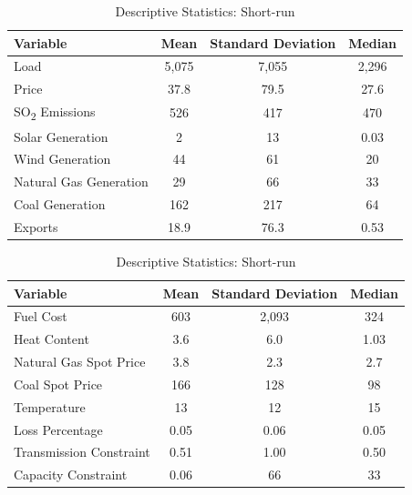 \documentclass[12pt]{article}
\begin{document}
\begin{table}[htbp]
\centering
\begin{tabular}{lccc}
\toprule
\textbf{Variable} & \textbf{Mean} & \textbf{Standard Deviation} & \textbf{Median} \\
\midrule
Load & 5{,}075 & 7{,}055 & 2{,}296 \\
Price & 37.8 & 79.5 & 27.6 \\
SO\textsubscript{2} Emissions & 526 & 417 & 470 \\
Solar Generation & 2 & 13 & 0.03 \\
Wind Generation & 44 & 61 & 20 \\
Natural Gas Generation & 29 & 66 & 33 \\
Coal Generation & 162 & 217 & 64 \\
Exports & 18.9 & 76.3 & 0.53 \\
\bottomrule
\end{tabular}
\caption{Descriptive Statistics: Short-run}
\label{ShortTermStats1}
\end{table}

\begin{table}[htbp]
\centering
\begin{tabular}{lccc}
\toprule
\textbf{Variable} & \textbf{Mean} & \textbf{Standard Deviation} & \textbf{Median} \\
\midrule
Fuel Cost & 603 & 2{,}093 & 324 \\
Heat Content & 3.6 & 6.0 & 1.03 \\
Natural Gas Spot Price & 3.8 & 2.3 & 2.7 \\
Coal Spot Price & 166 & 128 & 98 \\
Temperature & 13 & 12 & 15 \\
Loss Percentage & 0.05 & 0.06 & 0.05 \\
Transmission Constraint & 0.51 & 1.00 & 0.50 \\
Capacity Constraint & 0.06 & 66 & 33 \\
\bottomrule
\end{tabular}
\caption{Descriptive Statistics: Short-run}
\label{ShortTermStats2}
\end{table}
\end{document}
